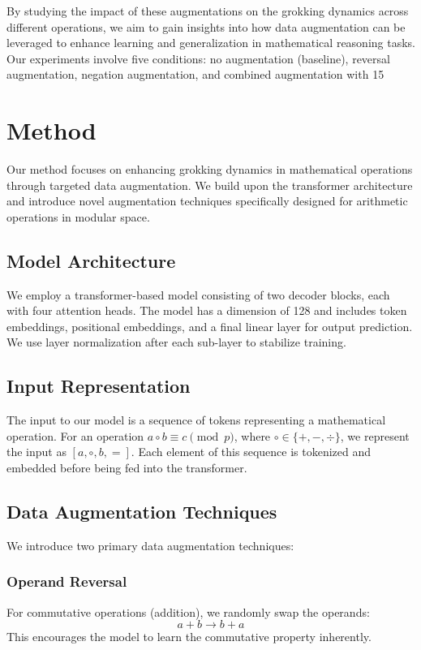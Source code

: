 \documentclass{article} %
\begin{document}
By studying the impact of these augmentations on the grokking dynamics across different operations, we aim to gain insights into how data augmentation can be leveraged to enhance learning and generalization in mathematical reasoning tasks. Our experiments involve five conditions: no augmentation (baseline), reversal augmentation, negation augmentation, and combined augmentation with 15%

\section{Method}
\label{sec:method}

Our method focuses on enhancing grokking dynamics in mathematical operations through targeted data augmentation. We build upon the transformer architecture \cite{vaswani2017attention} and introduce novel augmentation techniques specifically designed for arithmetic operations in modular space.

\subsection{Model Architecture}
We employ a transformer-based model consisting of two decoder blocks, each with four attention heads. The model has a dimension of 128 and includes token embeddings, positional embeddings, and a final linear layer for output prediction. We use layer normalization \cite{ba2016layer} after each sub-layer to stabilize training.

\subsection{Input Representation}
The input to our model is a sequence of tokens representing a mathematical operation. For an operation $a \circ b \equiv c \pmod{p}$, where $\circ \in \{+, -, \div\}$, we represent the input as $[a, \circ, b, =]$. Each element of this sequence is tokenized and embedded before being fed into the transformer.

\subsection{Data Augmentation Techniques}
We introduce two primary data augmentation techniques:

\subsubsection{Operand Reversal}
For commutative operations (addition), we randomly swap the operands:
\begin{equation}
    a + b \rightarrow b + a
\end{equation}
This encourages the model to learn the commutative property inherently.
\end{document}
